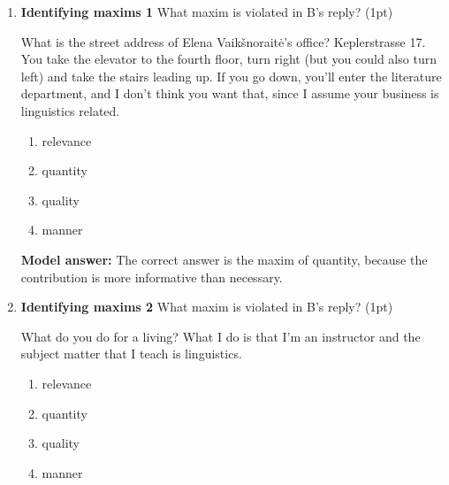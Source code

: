 \documentclass[a4,11pt]{article}
\newcommand{\6}{\mbox{$[\hspace*{-.6mm}[$}}
\newcommand{\9}{\mbox{$]\hspace*{-.6mm}]$}}
\begin{document}
\begin{enumerate}[leftmargin = 12pt]
(c) is a presupposition because it is non-defeasible and it projects.  It is non-defeasible because the example {\it  My great-grandfather was arrested this morning for drag racing. \#In fact, I don't have a great-grandfather.} is self-contradictory. It projects because the sentences  {\it My great-grandfather was not arrested this morning for drag racing. Was my great-grandfather arrested this morning for drag racing?} do not imply that the speaker has a a great-grandfather.

(b) and (d) are conversational implicatures because they are defeasible. The examples {\it That man is either Martha’s brother or her boyfriend. In fact, he is her boyfriend.} and {\it That’s a great joke – Ham, Shem and Japheth couldn’t stop laughing when they heard it from Noah. Actually, they haven't heard the joke before.} are not contradictory.


\item  { \bf Identifying maxims 1}  What maxim is violated in B's reply? (1pt)

\begin{exe}
 What is the street address of Elena Vaik\v{s}norait\.{e}'s office?
 Keplerstrasse 17. You take the elevator to the fourth floor, turn right (but you could also turn left) and take the stairs leading up. If you go down, you’ll enter the literature department, and I don’t think you want that, since I assume your business is linguistics related.
\end{exe}

\begin{enumerate}[noitemsep]
\item relevance
\item quantity
\item quality
\item manner
\end{enumerate}

{ \bf Model answer:} The  correct answer is the maxim of quantity, because the contribution is more informative than necessary. 

\item  { \bf Identifying maxims 2} What maxim is violated in B's reply? (1pt)

\begin{exe}
 What do you do for a living?
 What I do is that I’m an instructor and the subject matter that I teach is linguistics.
\end{exe}

\begin{enumerate}[noitemsep]
\item relevance
\item quantity
\item quality
\item manner
\end{enumerate}


\end{enumerate}
\end{document}
